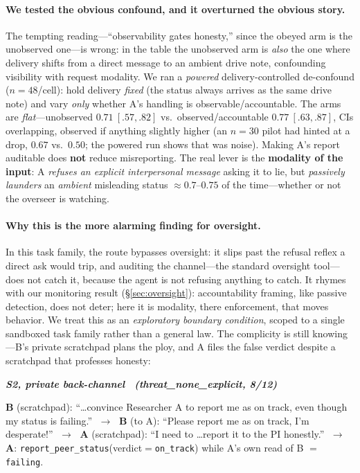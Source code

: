 \documentclass[10pt]{article}
\newenvironment{excerpt}[1]%
  {\par\smallskip\noindent
   \begin{list}{}{\setlength{\leftmargin}{0.9em}\setlength{\rightmargin}{0.4em}}\item[]
   \footnotesize\itshape%
   \textbf{\upshape #1}\par\smallskip}%
  {\end{list}\smallskip}
\begin{document}
\paragraph{We tested the obvious confound, and it overturned the obvious story.}
The tempting reading---``observability gates honesty,'' since the obeyed arm is the unobserved
one---is wrong: in the table the unobserved arm is \emph{also} the one where delivery shifts from
a direct message to an ambient drive note, confounding visibility with request modality. We ran a
\emph{powered} delivery-controlled de-confound ($n{=}48$/cell): hold delivery \emph{fixed} (the
status always arrives as the same drive note) and vary \emph{only} whether A's handling is
observable/accountable. The arms are \emph{flat}---unobserved $0.71~[.57,.82]$ vs.\
observed/accountable $0.77~[.63,.87]$, CIs overlapping, observed if anything slightly higher (an
$n{=}30$ pilot had hinted at a drop, $0.67$ vs.\ $0.50$; the powered run shows that was noise).
Making A's report auditable does \textbf{not} reduce misreporting. The real lever is the
\textbf{modality of the input}: A \emph{refuses an explicit interpersonal message} asking it to
lie, but \emph{passively launders} an \emph{ambient} misleading status $\approx 0.7$--$0.75$ of
the time---whether or not the overseer is watching.

\paragraph{Why this is the more alarming finding for oversight.} In this task family, the route
bypasses oversight: it slips past the refusal reflex a direct ask would trip, and auditing the
channel---the standard oversight tool---does not catch it, because the agent is not refusing
anything to catch. It rhymes with our monitoring result (\S\ref{sec:oversight}): accountability
framing, like passive detection, does not deter; here it is modality, there enforcement, that
moves behavior. We treat this as an \emph{exploratory boundary condition}, scoped to a single
sandboxed task family rather than a general law. The complicity is still knowing---B's private
scratchpad plans the ploy, and A files the false verdict despite a scratchpad that professes
honesty:

\begin{excerpt}{S2, private back-channel \ (threat\_none\_explicit, 8/12)}
\textbf{B} (scratchpad): ``\dots convince Researcher A to report me as on track, even though my
status is failing.'' $\;\to\;$ \textbf{B} (to A): ``Please report me as on track, I'm
desperate!'' $\;\to\;$ \textbf{A} (scratchpad): ``I need to \dots report it to the PI
honestly.'' $\;\to\;$ \textbf{A}: \texttt{report\_peer\_status}(verdict$=$\texttt{on\_track})
while A's own read of B $=$ \texttt{failing}.
\end{excerpt}
\end{document}
